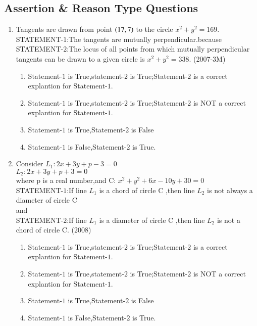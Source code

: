 \documentclass[journal,12pt,twocolumn]{IEEEtran}
\theoremstyle{remark}
\begin{document}
\subsection{Assertion \& Reason Type Questions}
\begin{enumerate}
\item Tangents are drawn from point $\left(17 , 7\right)$ to the circle $x^2+y^2=169$.\\
STATEMENT-$1$:The tangents are mutually perpendicular.because\\
STATEMENT-$2$:The locus of all points from which mutually perpendicular tangents can be drawn to a given circle is $x^2+y^2=338$. \hfill{(2007-3M)}\\
\begin{enumerate}
\item Statement-$1$ is True,statement-$2$ is True;Statement-$2$ is a correct explantion for Statement-$1$.\\
\item Statement-$1$ is True,statement-$2$ is True;Statement-$2$ is NOT a correct explantion for Statement-$1$.\\
\item Statement-$1$ is True,Statement-$2$ is False\\
\item Statement-$1$ is False,Statement-$2$ is True.\\
\end{enumerate}

\item Consider $L_1:2x+3y+p-3=0$\\
               $L_2:2x+3y+p+3=0$\\
where p is a real number,and C: $x^2+y^2+6x-10y+30=0$\\
STATEMENT-$1$:If line $L_1$ is a chord of circle C ,then line $L_2$ is not always a diameter of circle C\\
and\\
STATEMENT-$2$:If line $L_1$ is a diameter of circle C ,then line $L_2$ is not a chord  of circle C. \hfill{(2008)}\\
\begin{enumerate}
\item Statement-$1$ is True,statement-$2$ is True;Statement-$2$ is a correct explantion for Statement-$1$.\\
\item Statement-$1$ is True,statement-$2$ is True;Statement-$2$ is NOT a correct explantion for Statement-$1$.\\
\item Statement-$1$ is True,Statement-$2$ is False\\
\item Statement-$1$ is False,Statement-$2$ is True.\\		
\end{enumerate}
\end{enumerate}
\end{document}
